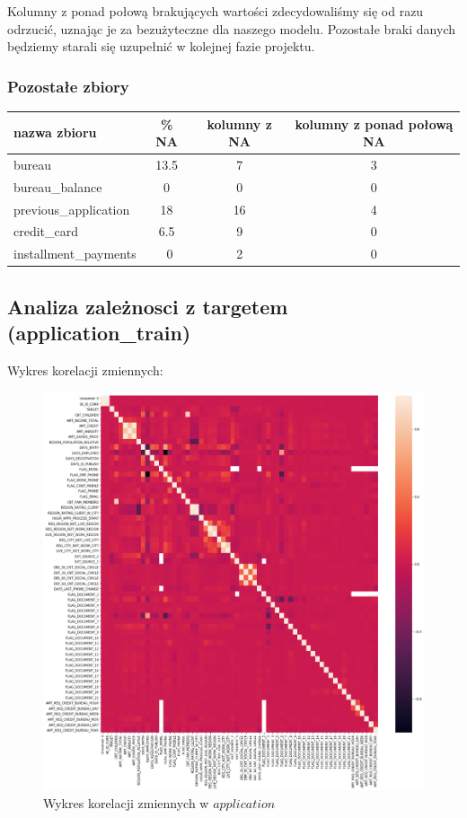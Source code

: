 \documentclass[12pt]{article}
\begin{document}
\FloatBarrier

Kolumny z ponad połową brakujących wartości zdecydowaliśmy się od razu odrzucić, uznając je za bezużyteczne dla naszego modelu.
Pozostałe braki danych będziemy starali się uzupełnić w kolejnej fazie projektu.

\subsubsection {Pozostałe zbiory}

\begin{table}[h]
\begin{tabular}{lccc}

nazwa zbioru & \% NA & kolumny z NA & kolumny z ponad połową NA \\ 
\hline \hline
bureau                & 13.5 & 7 & 3  \\
bureau\_balance       & 0 & 0 & 0  \\
previous\_application & 18  & 16 & 4 \\
credit\_card          & 6.5  & 9 & 0 \\
installment\_payments & ~0 & 2 & 0 \\
\end{tabular}
\end{table}

\newpage

\subsection{Analiza zależnosci z targetem (application\_train)}

Wykres korelacji zmiennych:


\begin{figure}[h!]
\centering
\includegraphics[scale=0.35]{corr.png}
\caption{Wykres korelacji zmiennych w $application$}
\end{figure}
\end{document}

